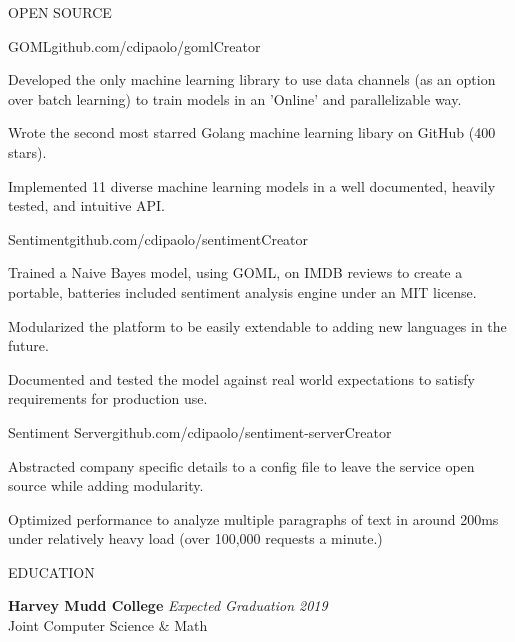 \documentclass{resume} %
\begin{document}
\begin{rSection}{OPEN SOURCE}

\begin{rSubsection}{GOML}{github.com/cdipaolo/goml}{Creator}

\item Developed the only machine learning library to use data channels (as an option over batch learning) to train models in an 'Online' and parallelizable way.
\item Wrote the second most starred Golang machine learning libary on GitHub (400 stars).
\item Implemented 11 diverse machine learning models in a well documented, heavily tested, and intuitive API.
\end{rSubsection}

\begin{rSubsection}{Sentiment}{github.com/cdipaolo/sentiment}{Creator}

\item Trained a Naive Bayes model, using GOML, on IMDB reviews to create a portable, batteries included sentiment analysis engine under an MIT license.
\item Modularized the platform to be easily extendable to adding new languages in the future.
\item Documented and tested the model against real world expectations to satisfy requirements for production use.
\end{rSubsection}

\begin{rSubsection}{Sentiment Server}{github.com/cdipaolo/sentiment-server}{Creator}

\item Abstracted company specific details to a config file to leave the service open source while adding modularity.
\item Optimized performance to analyze multiple paragraphs of text in around 200ms under relatively heavy load (over 100,000 requests a minute.)
\end{rSubsection}

\end{rSection}



\begin{rSection}{EDUCATION}

{\bf Harvey Mudd College} \hfill {\em Expected Graduation 2019} \\ 
Joint Computer Science \& Math
\end{rSection}
\end{document}
